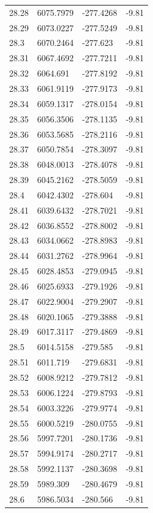\begin{table}[H]
\begin{tabular}{llll}
28.28 & 6075.7979 & -277.4268 & -9.81 \\
28.29 & 6073.0227 & -277.5249 & -9.81 \\
28.3 & 6070.2464 & -277.623 & -9.81 \\
28.31 & 6067.4692 & -277.7211 & -9.81 \\
28.32 & 6064.691 & -277.8192 & -9.81 \\
28.33 & 6061.9119 & -277.9173 & -9.81 \\
28.34 & 6059.1317 & -278.0154 & -9.81 \\
28.35 & 6056.3506 & -278.1135 & -9.81 \\
28.36 & 6053.5685 & -278.2116 & -9.81 \\
28.37 & 6050.7854 & -278.3097 & -9.81 \\
28.38 & 6048.0013 & -278.4078 & -9.81 \\
28.39 & 6045.2162 & -278.5059 & -9.81 \\
28.4 & 6042.4302 & -278.604 & -9.81 \\
28.41 & 6039.6432 & -278.7021 & -9.81 \\
28.42 & 6036.8552 & -278.8002 & -9.81 \\
28.43 & 6034.0662 & -278.8983 & -9.81 \\
28.44 & 6031.2762 & -278.9964 & -9.81 \\
28.45 & 6028.4853 & -279.0945 & -9.81 \\
28.46 & 6025.6933 & -279.1926 & -9.81 \\
28.47 & 6022.9004 & -279.2907 & -9.81 \\
28.48 & 6020.1065 & -279.3888 & -9.81 \\
28.49 & 6017.3117 & -279.4869 & -9.81 \\
28.5 & 6014.5158 & -279.585 & -9.81 \\
28.51 & 6011.719 & -279.6831 & -9.81 \\
28.52 & 6008.9212 & -279.7812 & -9.81 \\
28.53 & 6006.1224 & -279.8793 & -9.81 \\
28.54 & 6003.3226 & -279.9774 & -9.81 \\
28.55 & 6000.5219 & -280.0755 & -9.81 \\
28.56 & 5997.7201 & -280.1736 & -9.81 \\
28.57 & 5994.9174 & -280.2717 & -9.81 \\
28.58 & 5992.1137 & -280.3698 & -9.81 \\
28.59 & 5989.309 & -280.4679 & -9.81 \\
28.6 & 5986.5034 & -280.566 & -9.81 \\

\end{tabular}
\end{table}
